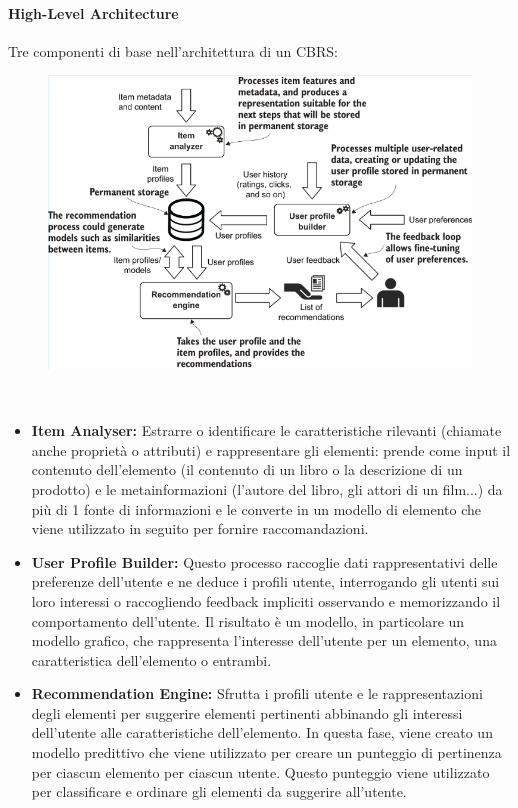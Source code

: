 \paragraph{High-Level Architecture} Tre componenti di base nell'architettura di un CBRS:
\\
\begin{figure}[th]
    \centering
    \includegraphics[width=0.4\linewidth]{RecommendationsGraph//img/cbrs.png}
\end{figure}
\\
\begin{itemize}
    \item \textbf{Item Analyser:} Estrarre o identificare le caratteristiche rilevanti (chiamate anche proprietà o attributi) e rappresentare gli elementi: prende come input il contenuto dell'elemento (il contenuto di un libro o la descrizione di un prodotto) e le metainformazioni (l'autore del libro, gli attori di un film...) da più di 1 fonte di informazioni e le converte in un modello di elemento che viene utilizzato in seguito per fornire raccomandazioni.
    \item \textbf{User Profile Builder:} Questo processo raccoglie dati rappresentativi delle preferenze dell'utente e ne deduce i profili utente, interrogando gli utenti sui loro interessi o raccogliendo feedback impliciti osservando e memorizzando il comportamento dell'utente. Il risultato è un modello, in particolare un modello grafico, che rappresenta l'interesse dell'utente per un elemento, una caratteristica dell'elemento o entrambi.
    \item \textbf{Recommendation Engine:} Sfrutta i profili utente e le rappresentazioni degli elementi per suggerire elementi pertinenti abbinando gli interessi dell'utente alle caratteristiche dell'elemento. In questa fase, viene creato un modello predittivo che viene utilizzato per creare un punteggio di pertinenza per ciascun elemento per ciascun utente. Questo punteggio viene utilizzato per classificare e ordinare gli elementi da suggerire all'utente.
\end{itemize}
